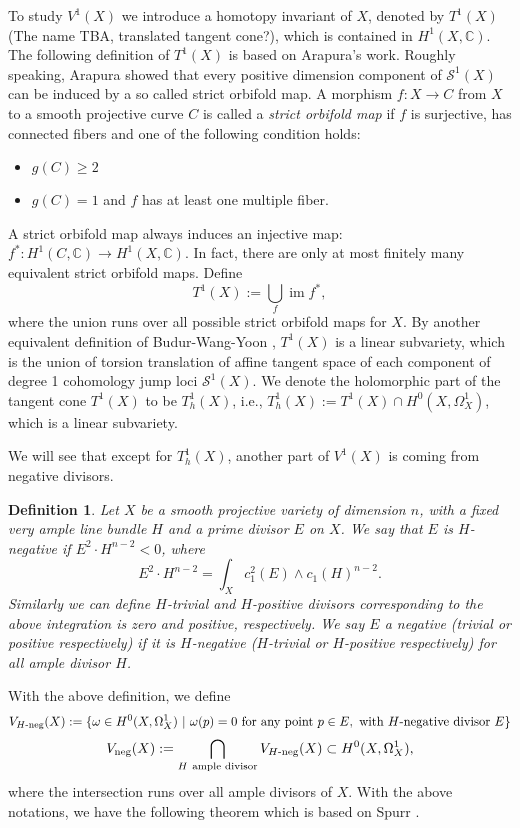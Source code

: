\documentclass[a4paper,12pt,reqno]{amsart}
\theoremstyle{plain}
\newtheorem{definition}[theorem]{Definition}
\theoremstyle{remark}
\newcommand{\C}{\mathbb C}
\newcommand{\im}{\operatorname{im}}
\begin{document}
To study $V^1(X)$ we introduce a homotopy invariant of $X$, denoted by $T^1(X)${\color{red} (The name TBA, translated tangent cone?)}, which is contained in $H^1(X, \C)$. The following definition of $T^1(X)$ is based on Arapura's work. Roughly speaking, Arapura \cite{Ara97} showed that every positive dimension component of $\mathcal{S}^1(X)$ can be induced by a so called strict orbifold map. A morphism $f:X\to C$ from $X$ to a smooth projective curve $C$ is called a  {\it strict orbifold map} if $f $ is surjective, has connected fibers and one of the following condition holds:
\begin{itemize}
\item $g(C)\geq 2$
\item $g(C)=1$ and $f$ has at least one multiple fiber.
\end{itemize}
A strict orbifold map always induces an injective map: $f^*: H^1(C, \C) \to H^1(X,\C)$. In fact, there are only at most finitely many equivalent strict orbifold maps. Define $$T^1(X):= \bigcup_f \im f^*,$$
where the union runs over all possible strict orbifold maps for $X$. By another equivalent definition of Budur-Wang-Yoon \cite{BWY16} , $T^1(X)$ is a linear subvariety, which is the union of torsion translation of affine tangent space of each component of degree 1 cohomology jump loci $\mathcal{S}^1(X)$. We denote the holomorphic part of the tangent cone $T^1(X)$ to be $T^1_h(X)$, i.e., $T_h^1(X):=T^1(X)\cap H^0(X, \Omega_X^1)$, which is a linear subvariety.

We will see that except for $T_h^1(X)$, another part of $V^1(X)$ is coming from negative divisors.
\begin{definition}
Let $X$ be a smooth projective variety of dimension $n$, with a fixed very ample line bundle $H$ and a prime divisor $E$ on $X$. We say that $E$ is $H$-negative if $E^2\cdot H^{n-2}<0$, where $$E^2\cdot H^{n-2}=\int_X c_1^2(E)\wedge c_1(H)^{n-2}.$$ Similarly we can define $H$-trivial and $H$-positive divisors corresponding to the above integration is zero and positive, respectively. We say $E$ a negative (trivial or positive respectively) if it is $H$-negative ($H$-trivial or $H$-positive respectively) for all ample divisor $H$.
\end{definition}  
With the above definition, we define $$V_{H\textnormal{-neg}}(X):=\{\omega\in H^0(X, \Omega_X^1)\ |\ \omega(p)=0\  \textnormal{for any point}\ p\in E, \ \textnormal{with $H$-negative divisor}\  E\}$$  $$V_{\textnormal{neg}}(X):=\bigcap_{H\ \textnormal{ample divisor}}V_{H\textnormal{-neg}}(X)\subset H^0(X, \Omega_X^1),$$ where the intersection runs over all ample divisors of $X$. With the above notations, we have the following theorem which is based on Spurr \cite[Theorem 2]{Sp88}.
\end{document}

